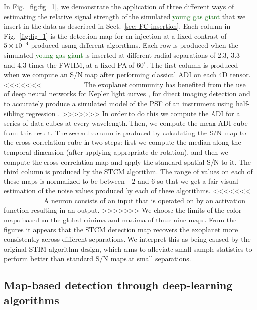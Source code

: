 \documentclass{aa}
\newcommand{\newchange}[1]{\textcolor{darkgreen}{#1}}
\begin{document}
{{In Fig.~\ref{fig:fig_1}, we demonstrate the application of three different ways of estimating the relative signal strength of the simulated \newchange{young gas giant} that we insert in the data as described in Sect.~\ref{sec: FC insertion}.
Each column in Fig.~\ref{fig:fig_1} is the detection map for an injection at a fixed contrast of $5\times 10^{-4}$ produced using different algorithms. %
Each row is produced when the simulated \newchange{young gas giant} is inserted at different radial separations of $2.3$, $3.3$ and $4.3$ times the FWHM, at a fixed PA of $60^{\circ}$.
The first column is produced when we compute an S/N map \citep[as defined in][]{2014Mawet} after performing classical ADI on each 4D tensor.
<<<<<<<
=======
The exoplanet community has benefited from the use of deep neural networks for Kepler light curves \cite{2018Pearson}, for direct imaging detection \cite{2018Gomez} and to accurately produce a simulated model of the PSF of an instrument using half-sibling regression \citep{2022Gebhard}.
>>>>>>>
In order to do this we compute the ADI for a series of data cubes at every wavelength. Then, we compute the mean ADI cube from this result. 
The second column is produced by calculating the S/N map \citep[as defined in][]{2014Mawet} to the cross correlation cube in two steps: first we compute the median along the temporal dimension (after applying appropriate de-rotation), and then we compute the cross correlation map and apply the standard spatial S/N to it.
The third column is produced by the STCM algorithm.
The range of values on each of these maps is normalized to be between $-2$ and $6$ so that we get a fair visual estimation of the noise values produced by each of these algorithms.
<<<<<<<
=======
A neuron consists of an input that is operated on by an activation function resulting in an output.
>>>>>>>
We choose the limits of the color maps based on the global minima and maxima of these nine maps.
From the figures it appears that the STCM detection map recovers the exoplanet more consistently across different separations. We interpret this as being caused by the original STIM algorithm design, which aims to alleviate small sample statistics to perform better than standard S/N maps at small separations.

\subsection{Map-based detection through deep-learning algorithms}\label{sec:ML algorithms}

}}
\end{document}
